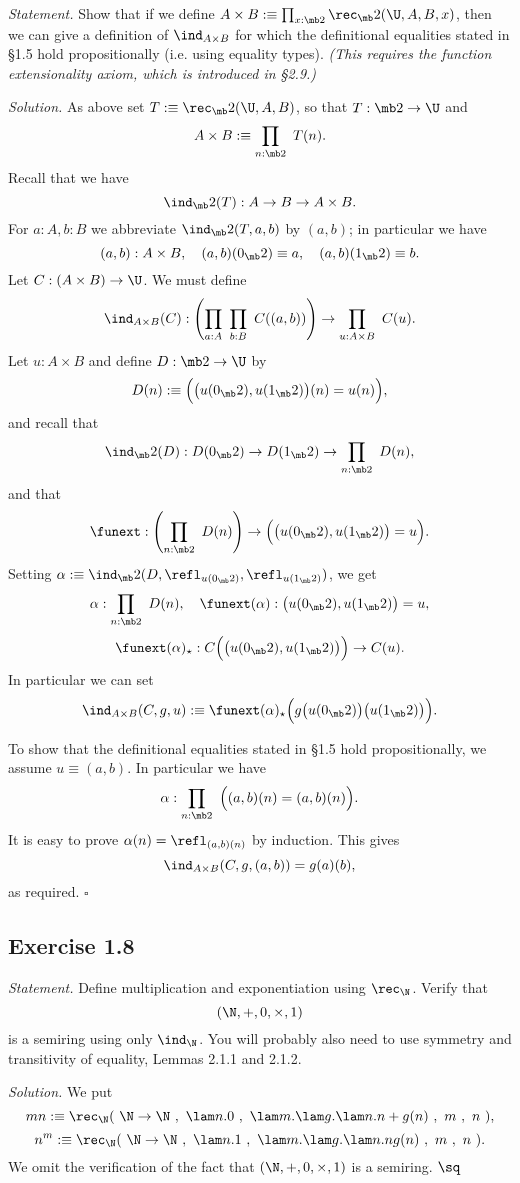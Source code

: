 \documentclass[12pt]{article}
\begin{document}
\emph{Statement.} Show that if we define $A\times B:\equiv\prod_{x:\mb2}\rec_\mb2(\U,A,B,x)$, then we can give a definition of  $\ind_{A\times B}$ for which the definitional equalities stated in \S1.5 hold propositionally (i.e. using equality types). \emph{(This requires the function extensionality axiom, which is introduced in \S2.9.)}

\nn\emph{Solution.} As above set $T:\equiv\rec_\mb2(\U,A,B)$, so that $T:\mb2\to\U$ and 
$$
A\times B:\equiv\prod_{n:\mb2}\ T(n).
$$ 
Recall that we have
$$
\ind_\mb2(T):A\to B\to A\times B.
$$ 
For $a:A,b:B$ we abbreviate $\ind_\mb2(T,a,b)$ by $(a,b)$; in particular we have 
$$
(a,b):A\times B,\quad(a,b)(0_\mb2)\equiv a,\quad(a,b)(1_\mb2)\equiv b.
$$ 
Let $C:(A\times B)\to\U$. We must define 
$$
\ind_{A\times B}(C):\left(\prod_{a:A}\ \prod_{b:B}\ C((a,b))\right)\to\prod_{u:A\times B}\ C(u).
$$ 
Let $u:A\times B$ and define $D:\mb2\to\U$ by 
$$
D(n):\equiv\Big(\big(u(0_\mb2),u(1_\mb2)\big)(n)=u(n)\Big),
$$ 
and recall that 
$$
\ind_\mb2(D):D(0_\mb2)\to D(1_\mb2)\to\prod_{n:\mb2}\ D(n),
$$ 
and that 
$$
\funext:\left(\prod_{n:\mb2}\ D(n)\right)\to\Big(\big(u(0_\mb2),u(1_\mb2)\big)=u\Big).
$$ 
Setting $\alpha:\equiv\ind_\mb2(D,\refl_{u(0_\mb2)},\refl_{u(1_\mb2)})$, we get 
$$
\alpha:\prod_{n:\mb2}\ D(n),\quad\funext(\alpha):\big(u(0_\mb2),u(1_\mb2)\big)=u,
$$
$$
\funext(\alpha)_\star:C\Big(\big(u(0_\mb2),u(1_\mb2)\big)\Big)\to C(u).
$$
In particular we can set
$$
\ind_{A\times B}(C,g,u):\equiv\funext(\alpha)_\star\Big(g\big(u(0_\mb2)\big)\big(u(1_\mb2)\big)\Big).
$$

To show that the definitional equalities stated in \S1.5 hold propositionally, we assume $u\equiv(a,b)$. In particular we have 
$$
\alpha:\prod_{n:\mb2}\ \Big((a,b)(n)=(a,b)(n)\Big).
$$ 
It is easy to prove $\alpha(n)=\refl_{(a,b)(n)}$ by induction. This gives 
$$
\ind_{A\times B}(C,g,(a,b))=g(a)(b),
$$ 
as required. $\square$


\subsection{Exercise 1.8}

\emph{Statement.} Define multiplication and exponentiation using $\rec_\N$. Verify that $$(\N,+,0,\times,1)$$ is a semiring using only $\ind_\N$. You will probably also need to use symmetry and transitivity of equality, Lemmas 2.1.1 and 2.1.2.

\nn\emph{Solution.} We put 
$$
mn:\equiv\rec_\N(\ \N\to\N\ ,\ \lam n.0\ ,\ \lam m.\lam g.\lam n.n+g(n)\ ,\ m\ ,\ n\ ),
$$
$$
n^m:\equiv\rec_\N(\ \N\to\N\ ,\ \lam n.1\ ,\ \lam m.\lam g.\lam n.ng(n)\ ,\ m\ ,\ n\ ).
$$ 
We omit the verification of the fact that $(\N,+,0,\times,1)$ is a semiring. $\sq$
\end{document}
